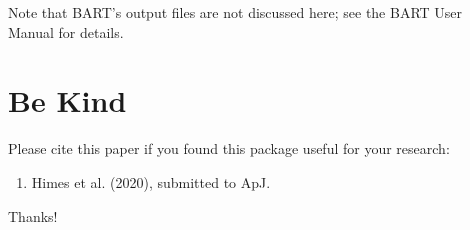 \documentclass[letterpaper, 12pt]{article}
\begin{document}
\noindent Note that BART's output files are not discussed here; see the BART 
User Manual for details.



\section{Be Kind}
\label{sec:bekind}
Please cite this paper if you found this package useful for your
research:

\begin{enumerate}
\item Himes et al. (2020), submitted to ApJ.
\end{enumerate}

\noindent Thanks!


\end{document}
